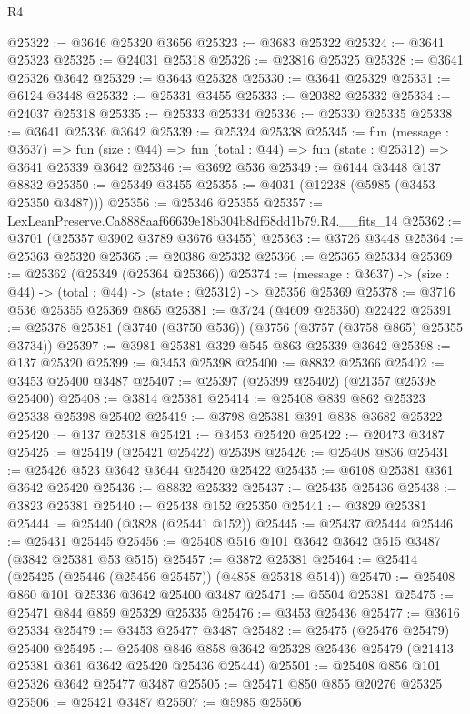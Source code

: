 \begin{lexlean}{R4}
\begin{coremodule}
@25322 := @3646 @25320 @3656
@25323 := @3683 @25322
@25324 := @3641 @25323
@25325 := @24031 @25318
@25326 := @23816 @25325
@25328 := @3641 @25326 @3642
@25329 := @3643 @25328
@25330 := @3641 @25329
@25331 := @6124 @3448
@25332 := @25331 @3455
@25333 := @20382 @25332
@25334 := @24037 @25318
@25335 := @25333 @25334
@25336 := @25330 @25335
@25338 := @3641 @25336 @3642
@25339 := @25324 @25338
@25345 := fun (message : @3637) =>
  fun (size : @44) => fun (total : @44) => fun (state : @25312) => @3641 @25339 @3642
@25346 := @3692 @536
@25349 := @6144 @3448 @137 @8832
@25350 := @25349 @3455
@25355 := @4031 (@12238 (@5985 (@3453 @25350 @3487)))
@25356 := @25346 @25355
@25357 := LexLeanPreserve.Ca8888aaf66639e18b304b8df68dd1b79.R4.__fits_14
@25362 := @3701 (@25357 @3902 @3789 @3676 @3455)
@25363 := @3726 @3448
@25364 := @25363 @25320
@25365 := @20386 @25332
@25366 := @25365 @25334
@25369 := @25362 (@25349 (@25364 @25366))
@25374 := (message : @3637) -> (size : @44) -> (total : @44) -> (state : @25312) -> @25356 @25369
@25378 := @3716 @536 @25355 @25369 @865
@25381 := @3724 (@4609 @25350) @22422
@25391 := @25378 @25381 (@3740 (@3750 @536)) (@3756 (@3757 (@3758 @865) @25355 @3734))
@25397 := @3981 @25381 @329 @545 @863 @25339 @3642
@25398 := @137 @25320
@25399 := @3453 @25398
@25400 := @8832 @25366
@25402 := @3453 @25400 @3487
@25407 := @25397 (@25399 @25402) (@21357 @25398 @25400)
@25408 := @3814 @25381
@25414 := @25408 @839 @862 @25323 @25338 @25398 @25402
@25419 := @3798 @25381 @391 @838 @3682 @25322
@25420 := @137 @25318
@25421 := @3453 @25420
@25422 := @20473 @3487
@25425 := @25419 (@25421 @25422) @25398
@25426 := @25408 @836
@25431 := @25426 @523 @3642 @3644 @25420 @25422
@25435 := @6108 @25381 @361 @3642 @25420
@25436 := @8832 @25332
@25437 := @25435 @25436
@25438 := @3823 @25381
@25440 := @25438 @152 @25350
@25441 := @3829 @25381
@25444 := @25440 (@3828 (@25441 @152))
@25445 := @25437 @25444
@25446 := @25431 @25445
@25456 := @25408 @516 @101 @3642 @3642 @515 @3487 (@3842 @25381 @53 @515)
@25457 := @3872 @25381
@25464 := @25414 (@25425 (@25446 (@25456 @25457)) (@4858 @25318 @514))
@25470 := @25408 @860 @101 @25336 @3642 @25400 @3487
@25471 := @5504 @25381
@25475 := @25471 @844 @859 @25329 @25335
@25476 := @3453 @25436
@25477 := @3616 @25334
@25479 := @3453 @25477 @3487
@25482 := @25475 (@25476 @25479) @25400
@25495 := @25408
    @846
    @858
    @3642
    @25328
    @25436
    @25479
    (@21413 @25381 @361 @3642 @25420 @25436 @25444)
@25501 := @25408 @856 @101 @25326 @3642 @25477 @3487
@25505 := @25471 @850 @855 @20276 @25325
@25506 := @25421 @3487
@25507 := @5985 @25506

\end{coremodule}
\end{lexlean}
